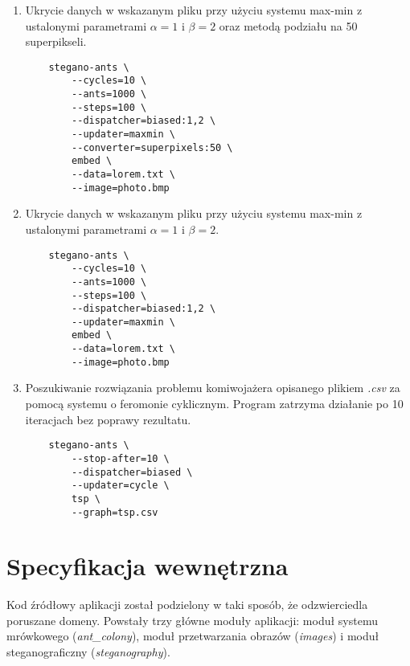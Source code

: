 {{{\begin{enumerate}
                \item Ukrycie danych w wskazanym pliku przy użyciu systemu max-min z ustalonymi parametrami $\alpha=1$ i
                $\beta=2$ oraz metodą podziału na 50 superpikseli.

                \begin{lstlisting}
    stegano-ants \
        --cycles=10 \
        --ants=1000 \
        --steps=100 \
        --dispatcher=biased:1,2 \
        --updater=maxmin \
        --converter=superpixels:50 \
        embed \
        --data=lorem.txt \
        --image=photo.bmp
                \end{lstlisting}

                \item Ukrycie danych w wskazanym pliku przy użyciu systemu max-min z ustalonymi parametrami $\alpha=1$ i
                $\beta=2$.

                \begin{lstlisting}
    stegano-ants \
        --cycles=10 \
        --ants=1000 \
        --steps=100 \
        --dispatcher=biased:1,2 \
        --updater=maxmin \
        embed \
        --data=lorem.txt \
        --image=photo.bmp
                \end{lstlisting}

                \item Poszukiwanie rozwiązania problemu komiwojażera opisanego plikiem \textit{.csv} za pomocą systemu o
                feromonie cyklicznym. Program zatrzyma działanie po 10 iteracjach bez poprawy rezultatu.

                \begin{lstlisting}
    stegano-ants \
        --stop-after=10 \
        --dispatcher=biased \
        --updater=cycle \
        tsp \
        --graph=tsp.csv
                \end{lstlisting}
            \end{enumerate}
        }
    }

    \section{Specyfikacja wewnętrzna}
    {
        Kod źródłowy aplikacji został podzielony w taki sposób, że odzwierciedla poruszane domeny. Powstały trzy główne
        moduły aplikacji: moduł systemu mrówkowego (\textit{ant\_colony}), moduł przetwarzania obrazów (\textit{images})
        i moduł steganograficzny (\textit{steganography}).


}}
